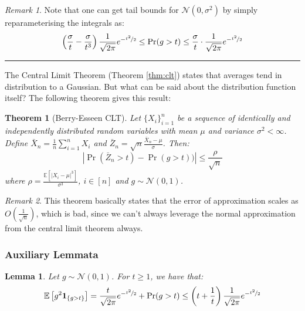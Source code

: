 \documentclass{article}
\newtheorem{theorem}{Theorem}[subsection]
\newtheorem{lemma}{Lemma}[subsection]
\theoremstyle{remark}
\newtheorem*{remark}{Remark}
\newcommand{\comprule}{\textcolor[RGB]{220,220,220}{\rule{\linewidth}{0.2pt}}}
\newcommand{\Exp}{\mathbb{E}}
\newcommand{\indic}[1]{\mathbf{1}_{\{#1\}}}
\newcommand{\calN}{\mathcal{N}}
\begin{document}
\begin{remark}
Note that one can get tail bounds for \(\calN(0, \sigma^{2})\) by simply reparameterising the integrals as:
\begin{equation*}
\left(\frac{\sigma}{t} - \frac{\sigma}{t^{3}}\right)\frac{1}{\sqrt{2\pi}}e^{-\nicefrac{t^{2}}{2}} \leq \Pr(g > t) \leq \frac{\sigma}{t}\cdot\frac{1}{\sqrt{2\pi}}e^{-\nicefrac{t^{2}}{2}}
\end{equation*}
\end{remark}

\comprule

The Central Limit Theorem (Theorem \ref{thm:clt}) states that averages tend in distribution to a Gaussian. But what can be said about the distribution function itself? The following theorem gives this result:
\begin{theorem}[Berry-Esseen CLT]
Let \(\{X_{i}\}_{i=1}^{n}\) be a sequence of identically and independently distributed random variables with mean \(\mu\) and variance \(\sigma^{2} < \infty\). Define \(\bar{X}_{n} = \frac{1}{n}\sum\limits_{i=1}^{n} X_{i}\) and \(\bar{Z}_{n} = \sqrt{n}\frac{\bar{X}_{n} - \mu}{\sigma}\). Then:
\begin{equation*}
\left|\Pr(\bar{Z}_{n} > t) - \Pr(g > t))\right| \leq \frac{\rho}{\sqrt{n}}
\end{equation*}
where \(\rho = \frac{\Exp\left[|X_{i} - \mu|^{3}\right]}{\sigma^{3}}\), \(i \in [n]\) and \(g \sim \calN(0, 1)\).
\end{theorem}

\begin{remark}
This theorem basically states that the error of approximation scales as \(O\left(\frac{1}{\sqrt{n}}\right)\), which is bad, since we can't always leverage the normal approximation from the central limit theorem always.
\end{remark}

\subsubsection{Auxiliary Lemmata}
\begin{lemma}
Let \(g \sim \calN(0, 1)\). For \(t \geq 1\), we have that:
\begin{equation*}
\Exp\left[g^{2} \indic{g > t}\right] = \frac{t}{\sqrt{2\pi}}e^{-\nicefrac{t^{2}}{2}} + \Pr(g > t) \leq \left(t + \frac{1}{t}\right)\frac{1}{\sqrt{2\pi}}e^{-\nicefrac{t^{2}}{2}}
\end{equation*}
\end{lemma}
\end{document}
